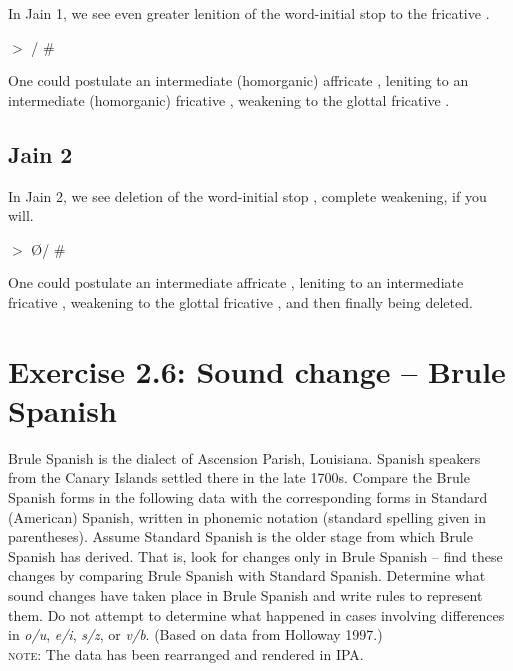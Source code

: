 \documentclass[12pt]{article}
\begin{document}
In Jain 1, we see even greater lenition of the word-initial stop  to the fricative .
\begin{center}
 $>$  / \#\und
\end{center}
One could postulate an intermediate (homorganic) affricate , leniting to an intermediate (homorganic) fricative , weakening to the glottal fricative .

\subsection{Jain 2}

In Jain 2, we see deletion of the word-initial stop , complete weakening, if you will.
\begin{center}
 $>$ \O / \#\und
\end{center}
One could postulate an intermediate affricate , leniting to an intermediate fricative , weakening to the glottal fricative , and then finally being deleted.

\section{Exercise 2.6: Sound change -- Brule Spanish}

Brule Spanish is the dialect of Ascension Parish, Louisiana. Spanish speakers from the Canary Islands settled there in the late 1700s. Compare the Brule Spanish forms in the following data with the corresponding forms in Standard (American) Spanish, written in phonemic notation (standard spelling given in parentheses). Assume Standard Spanish is the older stage from which Brule Spanish has derived. That is, look for changes only in Brule Spanish -- find these changes by comparing Brule Spanish with Standard Spanish. Determine what sound changes have taken place in Brule Spanish and write rules to represent them. Do not attempt to determine what happened in cases involving differences in {\it o/u}, {\it e/i}, {\it s/z}, or {\it v/b}. (Based on data from Holloway 1997.) \\
\textsc{note}: The data has been rearranged and rendered in IPA. \\
\end{document}
